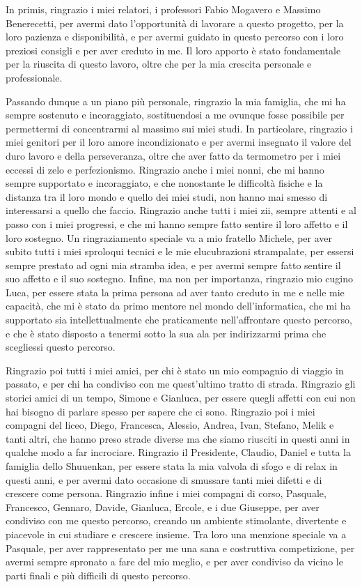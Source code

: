 \documentclass[
    blacklinks,
    libertine,
]{uninathesis}
\theoremstyle{plain}
\theoremstyle{definition}
\theoremstyle{remark}
\begin{document}
    In primis, ringrazio i miei relatori, i professori Fabio Mogavero e Massimo Benerecetti, per avermi dato l'opportunità di lavorare a questo progetto, per la loro pazienza e disponibilità, e per avermi guidato in questo percorso con i loro preziosi consigli e per aver creduto in me.
    Il loro apporto è stato fondamentale per la riuscita di questo lavoro, oltre che per la mia crescita personale e professionale.

    Passando dunque a un piano più personale, ringrazio la mia famiglia, che mi ha sempre sostenuto e incoraggiato, sostituendosi a me ovunque fosse possibile per permettermi di concentrarmi al massimo sui miei studi.
    In particolare, ringrazio i miei genitori per il loro amore incondizionato e per avermi insegnato il valore del duro lavoro e della perseveranza, oltre che aver fatto da termometro per i miei eccessi di zelo e perfezionismo.
    Ringrazio anche i miei nonni, che mi hanno sempre supportato e incoraggiato, e che nonostante le difficoltà fisiche e la distanza tra il loro mondo e quello dei miei studi, non hanno mai smesso di interessarsi a quello che faccio.
    Ringrazio anche tutti i miei zii, sempre attenti e al passo con i miei progressi, e che mi hanno sempre fatto sentire il loro affetto e il loro sostegno.
    Un ringraziamento speciale va a mio fratello Michele, per aver subito tutti i miei sproloqui tecnici e le mie elucubrazioni strampalate, per essersi sempre prestato ad ogni mia stramba idea, e per avermi sempre fatto sentire il suo affetto e il suo sostegno.
    Infine, ma non per importanza, ringrazio mio cugino Luca, per essere stata la prima persona ad aver tanto creduto in me e nelle mie capacità, che mi è stato da primo mentore nel mondo dell'informatica, che mi ha supportato sia intellettualmente che praticamente nell'affrontare questo percorso, e che è stato disposto a tenermi sotto la sua ala per indirizzarmi prima che scegliessi questo percorso.

    Ringrazio poi tutti i miei amici, per chi è stato un mio compagnio di viaggio in passato, e per chi ha condiviso con me quest'ultimo tratto di strada.
    Ringrazio gli storici amici di un tempo, Simone e Gianluca, per essere quegli affetti con cui non hai bisogno di parlare spesso per sapere che ci sono.
    Ringrazio poi i miei compagni del liceo, Diego, Francesca, Alessio, Andrea, Ivan, Stefano, Melik e tanti altri, che hanno preso strade diverse ma che siamo riusciti in questi anni in qualche modo a far incrociare.
    Ringrazio il Presidente, Claudio, Daniel e tutta la famiglia dello Shuuenkan, per essere stata la mia valvola di sfogo e di relax in questi anni, e per avermi dato occasione di smussare tanti miei difetti e di crescere come persona.
    Ringrazio infine i miei compagni di corso, Pasquale, Francesco, Gennaro, Davide, Gianluca, Ercole, e i due Giuseppe, per aver condiviso con me questo percorso, creando un ambiente stimolante, divertente e piacevole in cui studiare e crescere insieme.
    Tra loro una menzione speciale va a Pasquale, per aver rappresentato per me una sana e costruttiva competizione, per avermi sempre spronato a fare del mio meglio, e per aver condiviso da vicino le parti finali e più difficili di questo percorso.
\end{document}
